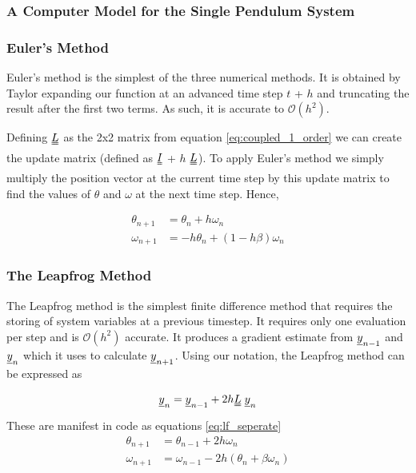 \documentclass[11pt]{article}
\begin{document}
\subsubsection*{A Computer Model for the Single Pendulum System}
\subsubsection*{Euler's Method}
Euler's method is the simplest of the three numerical methods. It is obtained by Taylor expanding our function at an advanced time step $t$ + $h$ and truncating the result after the first two terms. As such, it is accurate to $\mathcal{O}(h^2)$. 

Defining $\uuline{L}$ as the 2x2 matrix from equation \ref{eq:coupled_1_order} we can create the update matrix  (defined as $\uuline{I}$ + $h$ $\uuline{L}$). To apply Euler's method we simply multiply the position vector at the current time step by this update matrix to find the values of $\theta$ and $\omega$ at the next time step. Hence,

\begin{equation} \label{eq:euler_seperate}
	\begin{split}
		\theta_{n+1} &= \theta_{n} + h\omega_{n} \\
		\omega_{n+1} &= -h\theta_{n} + (1 -h \beta)\omega_{n}
	\end{split}
\end{equation}

\subsubsection*{The Leapfrog Method}
The Leapfrog method is the simplest finite difference method that requires the storing of system variables at a previous timestep. It requires only one evaluation per step and is $\mathcal{O}(h^2)$ accurate. It produces a gradient estimate from $\uline{y}_{n-1}$ and $\uline{y}_{n}$ which it uses to calculate $\uline{y}_{n+1}$.  Using our notation, the Leapfrog method can be expressed as

\begin{equation} \label{eq:lf_vector}
	\uline{y}_{n} = \uline{y}_{n-1} + 2 h \uuline{L} \; \uline{y}_{n}
\end{equation}
	These are manifest in code as equations \ref{eq:lf_seperate}
\begin{equation} \label{eq:lf_seperate}
	\begin{split}
		\theta_{n+1} &= \theta_{n-1} + 2h\omega_{n} \\
		\omega_{n+1} &= \omega_{n-1} - 2h( \theta_{n} + \beta \omega_{n} )
	\end{split}
\end{equation}
\end{document}
